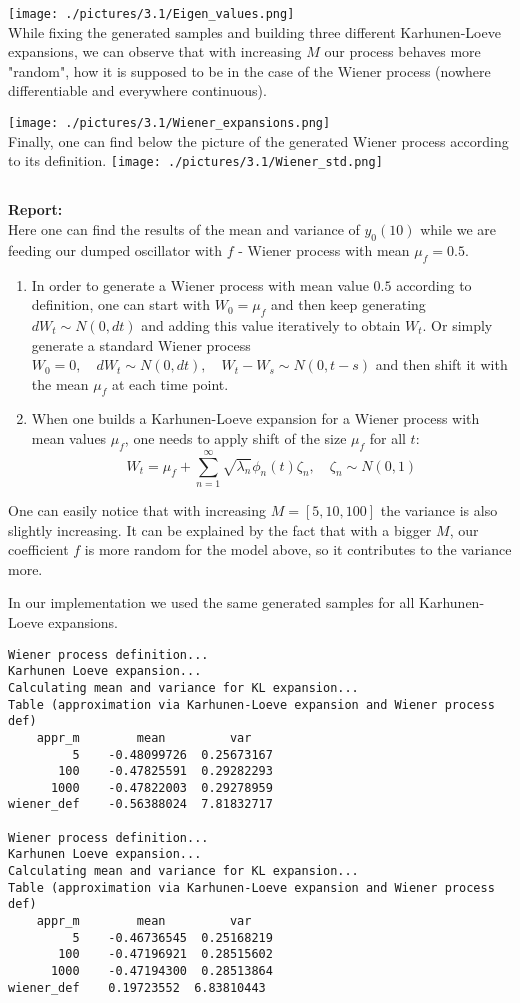 \documentclass[11pt]{article}
\newcommand{\subass}{\subsection{}}
\newcommand{\report}{\textbf{Report: \\}}
\begin{document}
\texttt{[image: ./pictures/3.1/Eigen\_values.png]}\\

While fixing the generated samples and building three different Karhunen-Loeve expansions, we can observe that with increasing $M$ our process behaves more "random", how it is supposed to be in the case of the Wiener process (nowhere differentiable and everywhere continuous).

\texttt{[image: ./pictures/3.1/Wiener\_expansions.png]} \\
Finally, one can find below the picture of the generated Wiener process according to its definition.
\texttt{[image: ./pictures/3.1/Wiener\_std.png]}\\
\subass
\report
Here one can find the results of the mean and variance of $y_0(10)$ while we are feeding our dumped oscillator with $f$ -  Wiener process with mean $\mu_f = 0.5$. 
\begin{enumerate}
\item In order to generate a Wiener process with mean value $0.5$ according to definition, one can start with $W_0 = \mu_f$ and then keep generating $dW_t \sim N(0, dt)$ and adding this value iteratively to obtain $W_t$. Or simply generate a standard Wiener process $W_0 = 0, \quad dW_t \sim N(0, dt), \quad W_t - W_s  \sim N(0, t-s)$ and then shift it with the mean $\mu_f$ at each time point.

\item When one builds a Karhunen-Loeve expansion for a Wiener process with mean values $\mu_f$, one needs to apply shift of the size $\mu_f$ for all $t$:
$$ W_t = \mu_f + \sum_{n = 1}^{\infty}\sqrt{\lambda_n} \phi_n(t)\zeta_n, \quad \zeta_n \sim N(0,1)
$$
\end{enumerate}

One can easily notice that with increasing $M = [5,10,100]$ the variance is also slightly increasing. It can be explained by the fact that with a bigger $M$, our coefficient $f$ is more random for the model above, so it contributes to the variance more.\par
In our implementation we used the same generated samples for all Karhunen-Loeve expansions.
\begin{lstlisting}
Wiener process definition...
Karhunen Loeve expansion...
Calculating mean and variance for KL expansion...
Table (approximation via Karhunen-Loeve expansion and Wiener process def)
    appr_m        mean         var
         5    -0.48099726  0.25673167
       100    -0.47825591  0.29282293
      1000    -0.47822003  0.29278959
wiener_def    -0.56388024  7.81832717

Wiener process definition...
Karhunen Loeve expansion...
Calculating mean and variance for KL expansion...
Table (approximation via Karhunen-Loeve expansion and Wiener process def)
    appr_m        mean         var
         5    -0.46736545  0.25168219
       100    -0.47196921  0.28515602
      1000    -0.47194300  0.28513864
wiener_def    0.19723552  6.83810443
\end{lstlisting}
\end{document}
